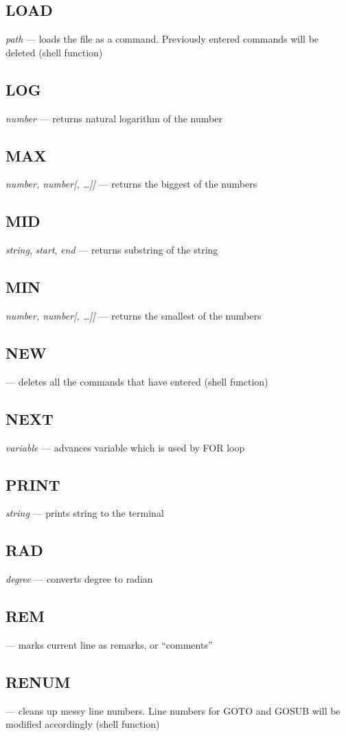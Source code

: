 \subsection{LOAD} \emph{path} --- loads the file as a command. Previously entered commands will be deleted (shell function)
\subsection{LOG} \emph{number} --- returns natural logarithm of the number
\subsection{MAX} \emph{number, number[, \ldots]]} --- returns the biggest of the numbers
\subsection{MID} \emph{string}, \emph{start}, \emph{end} --- returns substring of the string
\subsection{MIN} \emph{number, number[, \ldots]]} --- returns the smallest of the numbers
\subsection{NEW} --- deletes all the commands that have entered (shell function)
\subsection{NEXT} \emph{variable} --- advances variable which is used by FOR loop
\subsection{PRINT} \emph{string} --- prints string to the terminal
\subsection{RAD} \emph{degree} --- converts degree to radian
\subsection{REM} --- marks current line as remarks, or ``comments''
\subsection{RENUM} --- cleans up messy line numbers. Line numbers for GOTO and GOSUB will be modified accordingly (shell function)
